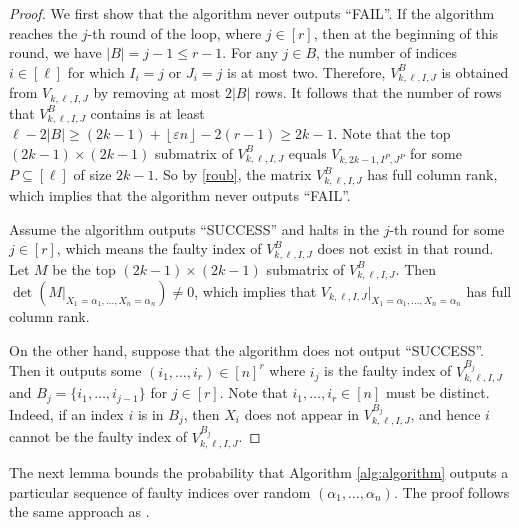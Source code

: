 \documentclass[11pt]{article}
\theoremstyle{plain}
\theoremstyle{definition}
\theoremstyle{remark}
\newcommand{\floor}[1]{\left\lfloor #1 \right\rfloor}
\begin{document}
\begin{proof}
We first show that the algorithm never outputs ``FAIL''.
If the algorithm reaches the $j$-th round of the loop, where $j\in [r]$, then at the beginning of this round, we have $|B|=j-1\leq r-1$. 
For any $j\in B$, the number of indices $i\in [\ell]$ for which $I_i=j$ or $J_i=j$ is at most two. 
Therefore, $V_{k,\ell,I,J}^{B}$ is obtained from $V_{k,\ell,I,J}$ by removing at most $2|B|$ rows.
It follows that the number of rows that $V_{k,\ell,I,J}^{B}$ contains is at least $\ell-2|B|\geq (2k-1)+\floor{\varepsilon n} - 2(r-1)\geq 2k-1$.
Note that the top $(2k-1)\times(2k-1)$ submatrix of $V_{k,\ell,I,J}^{B}$ equals $V_{k,2k-1,I^P,J^P}$ for some $P\subseteq [\ell]$ of size $2k-1$.
So by \cref{roub}, the matrix $V_{k,\ell,I,J}^{B}$ has full column rank, which implies that the algorithm never outputs ``FAIL''. 

Assume the algorithm outputs ``SUCCESS'' and halts in the $j$-th round for some $j\in [r]$, which means the faulty index of $V_{k,\ell,I,J}^{B}$
does not exist in that round. 
Let $M$ be the top $(2k-1)\times (2k-1)$ submatrix of $V_{k,\ell,I,J}^{B}$.
Then $\det(M|_{X_1=\alpha_1,\dots,X_{n}=\alpha_{n}})\neq 0$, which implies that $V_{k,\ell,I,J}|_{X_1=\alpha_1,\dots,X_{n}=\alpha_{n}}$ has full column rank.

On the other hand, suppose that the algorithm does not output ``SUCCESS''. Then it outputs some $(i_1,\dots,i_r)\in [n]^r$ where $i_j$ is the faulty index of $V_{k,\ell,I,J}^{B_j}$ and $B_j=\{i_1,\dots,i_{j-1}\}$ for $j\in [r]$. Note that $i_1,\dots,i_r\in [n]$ must be distinct. Indeed, if an index $i$ is in $B_j$, then $X_i$ does not appear in $V_{k,\ell,I,J}^{B_j}$, and hence $i$ cannot be the faulty index of $V_{k,\ell,I,J}^{B_j}$. 
\end{proof}

The next lemma bounds the probability that Algorithm \ref{alg:algorithm} outputs a particular sequence of faulty indices over random $(\alpha_1,\dots,\alpha_n)$. The proof follows the same approach as \cite[Lemma~4.5]{GZ23}.
\end{document}
